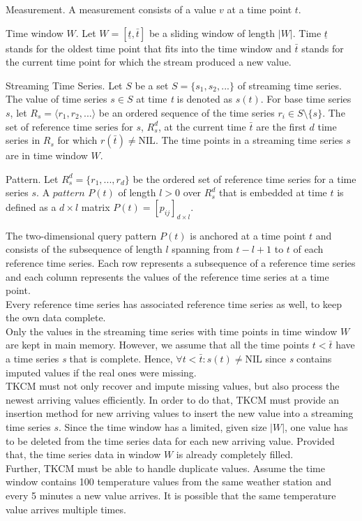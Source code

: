 \documentclass[abstracton,12pt]{scrreprt}
\begin{document}
\begin{defn}
	Measurement. A measurement consists of a value $v$ at a time point $t$.
\end{defn}
\begin{defn}
	Time window $W$. Let $W=[ \underline{t}, \bar{t} ]$ be a sliding window of length $|W|$. Time $\underline{t}$ stands for the oldest time point that fits into the time window and $\bar{t}$ stands for the current time point for which the stream produced a new value. 
\end{defn}
\begin{defn}
	Streaming Time Series. Let $S$ be a set $S = \{s_1,s_2,...\}$ of streaming time series. The value of time series $s \in S$ at time \emph{t} is denoted as $s(t)$. For base time series $s$, let $R_s = \langle r_1, r_2,...\rangle$ be an ordered sequence of the time series $r_i \in S \setminus \{s\}$. The set of $\text{reference time series}$ for $s$, $R_s^d$, at the current time $\bar{t}$ are the first $d$ time series in $R_s$ for which $r(\bar{t}) \neq \text{NIL}$.
	The time points in a streaming time series $s$ are in time window $W$. 
\end{defn}
\begin{defn}
	Pattern. Let $R_s^d=\{r_1,...,r_d\}$ be the ordered set of reference time series for a time series $s$. A $pattern$ $P(t)$ of length $l > 0$ over $R_s^d$ that is embedded at time $t$ is defined as a $d\times l$ matrix $P(t) = [p_{ij}]_{d\times l}$. 
\end{defn}
The two-dimensional query pattern $P(t)$ is anchored at a time point $t$ and consists of the subsequence of length $l$ spanning from $t-l+1$ to $t$ of each reference time series. Each row represents a subsequence of a reference time series and each column represents the values of the reference time series at a time point.\\Every reference time series has associated reference time series as well, to keep the own data complete.\\ 
Only the values in the streaming time series with time points in time window $W$ are kept in main memory. However, we assume that all the time points $t < \bar{t}$ have a time series \emph{s} that is complete. Hence, $\forall t < \bar{t} : s(t) \ne \text{NIL}$ since \emph{s} contains imputed values if the real ones were missing. \\
TKCM must not only recover and impute missing values, but also process the newest arriving values efficiently. In order to do that, TKCM must provide an insertion method for new arriving values to insert the new value into a streaming time series $s$. Since the time window has a limited, given size $|W|$, one value has to be deleted from the time series data for each new arriving value. Provided that, the time series data in window $W$ is already completely filled. \\       
Further, TKCM must be able to handle duplicate values. Assume the time window contains 100 temperature values from the same weather station and every 5 minutes a new value arrives. It is possible that the same temperature value arrives multiple times.
\end{document}

